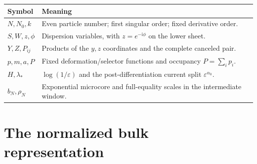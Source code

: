 \documentclass[11pt]{article}
\numberwithin{equation}{section}
\theoremstyle{definition}
\newcommand{\ii}{\mathrm i}
\newcommand{\eps}{\varepsilon}
\begin{document}
\begin{center}
\begin{tabular}{p{}p{}}
\toprule
Symbol & Meaning\\
\midrule
\(N,N_0,k\) & Even particle number; first singular order; fixed derivative order.\\
\(S,W,z,\phi\) & Dispersion variables, with \(z=e^{-\ii\phi}\) on the lower sheet.\\
\(Y,Z,P_{ij}\) & Products of the \(y,z\) coordinates and the complete canceled pair.\\
\(p,m,a,P\) & Fixed deformation/selector functions and occupancy \(P=\sum_i p_i\).\\
\(H,\lambda_*\) & \(\log(1/\eps)\) and the post-differentiation current split \(\eps^{\alpha_0}\).\\
\(b_N,\rho_N\) & Exponential microcore and full-equality scales in the intermediate window.\\
\bottomrule
\end{tabular}
\end{center}


\clearpage
\tableofcontents
\clearpage

\section{The normalized bulk representation}\label{sec:setup}
\end{document}
